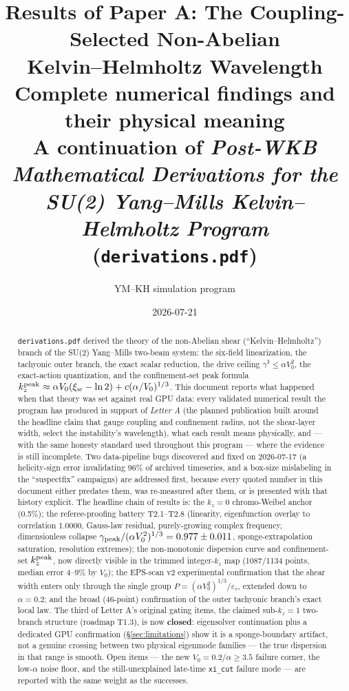 \documentclass[11pt,a4paper]{article}
\title{\textbf{Results of Paper A: The Coupling-Selected Non-Abelian\\
Kelvin--Helmholtz Wavelength}\\[1ex]
\large Complete numerical findings and their physical meaning\\[0.3ex]
\normalsize A continuation of \emph{Post-WKB Mathematical Derivations for the
SU(2) Yang--Mills Kelvin--Helmholtz Program} (\texttt{derivations.pdf})}
\author{YM--KH simulation program}
\date{2026-07-21}
\numberwithin{equation}{section}
\theoremstyle{remark}
\newcommand{\eps}{\varepsilon_s}
\newcommand{\Vo}{V_0}
\newcommand{\kz}{k_z}
\begin{document}
\maketitle

\begin{abstract}
\noindent
\texttt{derivations.pdf} derived the theory of the non-Abelian shear
(``Kelvin--Helmholtz'') branch of the SU(2) Yang--Mills two-beam system: the
six-field linearization, the tachyonic outer branch, the exact scalar
reduction, the drive ceiling $\gamma^3\le\alpha\Vo^2$, the exact-action
quantization, and the confinement-set peak formula
$\kz^{\rm peak}\approx\alpha\Vo(\xi_w-\ln2)+c(\alpha/\Vo)^{1/3}$. This
document reports what happened when that theory was set against real GPU
data: every validated numerical result the program has produced in support
of \emph{Letter A} (the planned publication built around the headline claim
that gauge coupling and confinement radius, not the shear-layer width,
select the instability's wavelength), what each result means physically,
and — with the same honesty standard used throughout this program — where
the evidence is still incomplete. Two data-pipeline bugs discovered and
fixed on 2026-07-17 (a helicity-sign error invalidating 96\% of archived
timeseries, and a box-size mislabeling in the ``suspectfix'' campaigns) are
addressed first, because every quoted number in this document either
predates them, was re-measured after them, or is presented with that
history explicit. The headline chain of results is: the $\kz=0$
chromo-Weibel anchor (0.5\%); the referee-proofing battery T2.1--T2.8
(linearity, eigenfunction overlay to correlation 1.0000, Gauss-law
residual, purely-growing complex frequency, dimensionless collapse
$\gamma_{\rm peak}/(\alpha\Vo^2)^{1/3}=0.977\pm0.011$, sponge-extrapolation
saturation, resolution extremes); the non-monotonic dispersion curve and
confinement-set $\kz^{\rm peak}$, now directly visible in the trimmed
integer-$\kz$ map (1087/1134 points, median error 4--9\% by $V_0$); the
EPS-scan v2 experimental confirmation that the shear width enters only
through the single group $P=(\alpha\Vo^2)^{1/3}/\eps$, extended down to
$\alpha=0.2$; and the broad (46-point) confirmation of the outer tachyonic
branch's exact local law. The third of Letter A's original gating items,
the claimed sub-$\kz=1$ two-branch structure (roadmap T1.3), is now
\textbf{closed}: eigensolver continuation plus a dedicated GPU confirmation
(\S\ref{sec:limitations}) show it is a sponge-boundary artifact, not a
genuine crossing between two physical eigenmode families — the true
dispersion in that range is smooth. Open items — the new
$V_0=0.2/\alpha\ge3.5$ failure corner, the low-$\alpha$ noise floor, and the
still-unexplained late-time \texttt{xi\_cut} failure mode — are reported
with the same weight as the successes.
\end{abstract}
\end{document}
